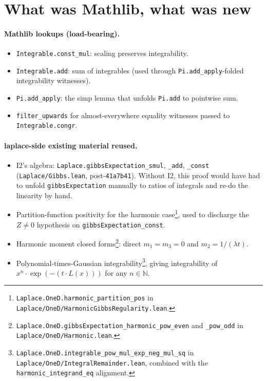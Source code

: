 \documentclass[11pt]{article}
\begin{document}
\section{What was Mathlib, what was new}

\paragraph{Mathlib lookups (load-bearing).}
\begin{itemize}[leftmargin=2em]
\item \texttt{Integrable.const\_mul}: scaling preserves integrability.
\item \texttt{Integrable.add}: sum of integrables (used through
\texttt{Pi.add\_apply}-folded integrability witnesses).
\item \texttt{Pi.add\_apply}: the simp lemma that unfolds
\texttt{Pi.add} to pointwise sum.
\item \texttt{filter\_upwards} for almost-everywhere equality
witnesses passed to \texttt{Integrable.congr}.
\end{itemize}

\paragraph{laplace-side existing material reused.}
\begin{itemize}[leftmargin=2em]
\item I2's algebra: \texttt{Laplace.gibbsExpectation\_smul},
\texttt{\_add}, \texttt{\_const} (\texttt{Laplace/Gibbs.lean},
post-\texttt{41a7b41}). Without I2, this proof would have had to
unfold \texttt{gibbsExpectation} manually to ratios of integrals
and re-do the linearity by hand.
\item Partition-function positivity for the harmonic
case\footnote{\texttt{Laplace.OneD.harmonic\_partition\_pos} in
\texttt{Laplace/OneD/HarmonicGibbsRegularity.lean}.}, used to
discharge the $Z \neq 0$ hypothesis on
\texttt{gibbsExpectation\_const}.
\item Harmonic moment closed forms\footnote{\texttt{Laplace.OneD.gibbsExpectation\_harmonic\_pow\_even}
and \texttt{\_pow\_odd} in \texttt{Laplace/OneD/Harmonic.lean}.}:
direct $m_1 = m_3 = 0$ and $m_2 = 1/(\lambda t)$.
\item Polynomial-times-Gaussian integrability\footnote{\texttt{Laplace.OneD.integrable\_pow\_mul\_exp\_neg\_mul\_sq}
in \texttt{Laplace/OneD/IntegralRemainder.lean}, combined with the
\texttt{harmonic\_integrand\_eq} alignment.}, giving integrability of
$x^n \cdot \exp(-(t \cdot L(x)))$ for any $n \in \mathbb{N}$.
\end{itemize}
\end{document}
